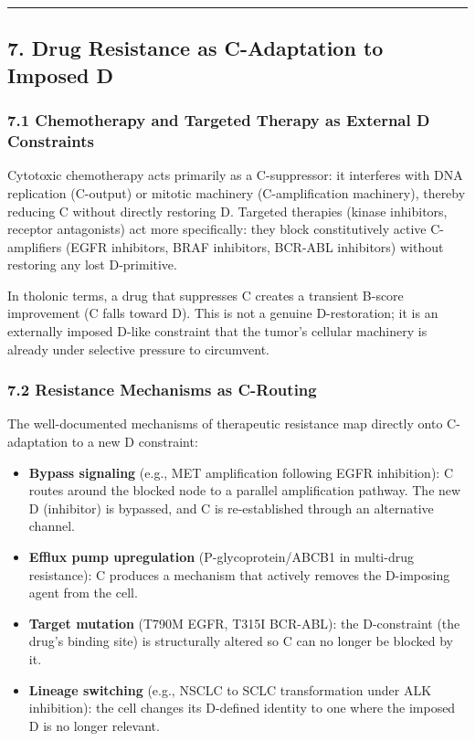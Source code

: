 \documentclass[
  11pt,
  letterpaper,
]{article}
\providecommand{\tightlist}{%
  \setlength{\itemsep}{0pt}\setlength{\parskip}{0pt}}
\begin{document}
\begin{center}\rule{0.5\linewidth}{0.5pt}\end{center}

\subsection{7. Drug Resistance as C-Adaptation to Imposed
D}\label{drug-resistance-as-c-adaptation-to-imposed-d}

\subsubsection{7.1 Chemotherapy and Targeted Therapy as External D
Constraints}\label{chemotherapy-and-targeted-therapy-as-external-d-constraints}

Cytotoxic chemotherapy acts primarily as a C-suppressor: it interferes
with DNA replication (C-output) or mitotic machinery (C-amplification
machinery), thereby reducing C without directly restoring D. Targeted
therapies (kinase inhibitors, receptor antagonists) act more
specifically: they block constitutively active C-amplifiers (EGFR
inhibitors, BRAF inhibitors, BCR-ABL inhibitors) without restoring any
lost D-primitive.

In tholonic terms, a drug that suppresses C creates a transient B-score
improvement (C falls toward D). This is not a genuine D-restoration; it
is an externally imposed D-like constraint that the tumor's cellular
machinery is already under selective pressure to circumvent.

\subsubsection{7.2 Resistance Mechanisms as
C-Routing}\label{resistance-mechanisms-as-c-routing}

The well-documented mechanisms of therapeutic resistance map directly
onto C-adaptation to a new D constraint:

\begin{itemize}
\tightlist
\item
  \textbf{Bypass signaling} (e.g., MET amplification following EGFR
  inhibition): C routes around the blocked node to a parallel
  amplification pathway. The new D (inhibitor) is bypassed, and C is
  re-established through an alternative channel.
\item
  \textbf{Efflux pump upregulation} (P-glycoprotein/ABCB1 in multi-drug
  resistance): C produces a mechanism that actively removes the
  D-imposing agent from the cell.
\item
  \textbf{Target mutation} (T790M EGFR, T315I BCR-ABL): the D-constraint
  (the drug's binding site) is structurally altered so C can no longer
  be blocked by it.
\item
  \textbf{Lineage switching} (e.g., NSCLC to SCLC transformation under
  ALK inhibition): the cell changes its D-defined identity to one where
  the imposed D is no longer relevant.
\end{itemize}
\end{document}
